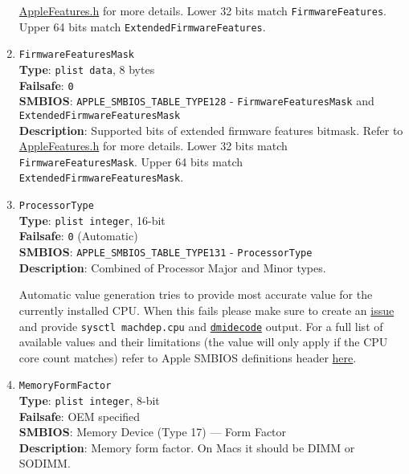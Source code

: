 \documentclass[]{article}
\begin{document}
\begin{enumerate}
  \href{https://github.com/acidanthera/OpenCorePkg/blob/master/Include/Apple/IndustryStandard/AppleFeatures.h}{AppleFeatures.h}
  for more details. Lower 32 bits match \texttt{FirmwareFeatures}. Upper
  64 bits match \texttt{ExtendedFirmwareFeatures}.
\item
  \texttt{FirmwareFeaturesMask}\\
  \textbf{Type}: \texttt{plist\ data}, 8 bytes\\
  \textbf{Failsafe}: \texttt{0}\\
  \textbf{SMBIOS}: \texttt{APPLE\_SMBIOS\_TABLE\_TYPE128} -
  \texttt{FirmwareFeaturesMask} and
  \texttt{ExtendedFirmwareFeaturesMask}\\
  \textbf{Description}: Supported bits of extended firmware features
  bitmask. Refer to
  \href{https://github.com/acidanthera/OpenCorePkg/blob/master/Include/Apple/IndustryStandard/AppleFeatures.h}{AppleFeatures.h}
  for more details. Lower 32 bits match \texttt{FirmwareFeaturesMask}.
  Upper 64 bits match \texttt{ExtendedFirmwareFeaturesMask}.
\item
  \texttt{ProcessorType}\\
  \textbf{Type}: \texttt{plist\ integer}, 16-bit\\
  \textbf{Failsafe}: \texttt{0} (Automatic)\\
  \textbf{SMBIOS}: \texttt{APPLE\_SMBIOS\_TABLE\_TYPE131} -
  \texttt{ProcessorType}\\
  \textbf{Description}: Combined of Processor Major and Minor types.

  Automatic value generation tries to provide most accurate value for
  the currently installed CPU. When this fails please make sure to create
  an \href{https://github.com/acidanthera/bugtracker/issues}{issue} and
  provide \texttt{sysctl machdep.cpu} and
  \href{https://github.com/acidanthera/dmidecode}{\texttt{dmidecode}} output.
  For a full list of available values and their limitations (the value will
  only apply if the CPU core count matches) refer to Apple SMBIOS definitions header
  \href{https://github.com/acidanthera/OpenCorePkg/blob/master/Include/Apple/IndustryStandard/AppleSmBios.h}{here}.
\item
  \texttt{MemoryFormFactor}\\
  \textbf{Type}: \texttt{plist\ integer}, 8-bit\\
  \textbf{Failsafe}: OEM specified\\
  \textbf{SMBIOS}: Memory Device (Type 17) --- Form Factor\\
  \textbf{Description}: Memory form factor. On Macs it should be DIMM or
  SODIMM.
\end{enumerate}
\end{document}
